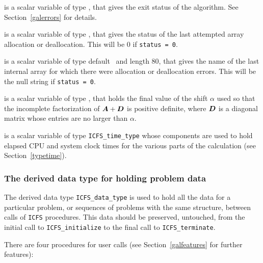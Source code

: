 \documentclass{galahad}
\newcommand{\packagename}{ICFS}
\begin{document}
\begin{description}
 is a scalar variable of type \integer, that gives the
exit status of the algorithm.
See Section~\ref{galerrors} for details.

 is a scalar variable of type \integer, that gives
the status of the last attempted array allocation or deallocation.
This will be 0 if {\tt status = 0}.

 is a scalar variable of type default \character\
and length 80, that  gives the name of the last internal array
for which there were allocation or deallocation errors.
This will be the null string if {\tt status = 0}.

 is a scalar variable of type \realdp, that holds
the final value of the shift $\alpha$ used so that the incomplete
factorization of ${\bm{A}} + {\bm{D}}$ is positive definite, where ${\bm{D}}$ is
a diagonal matrix whose entries are no larger than $\alpha$.

 is a scalar variable of type {\tt \packagename\_time\_type}
whose components are used to hold elapsed CPU and system clock times for the
various parts of the calculation (see Section~\ref{typetime}).

\end{description}


\subsubsection{The derived data type for holding problem data}\label{typedata}
The derived data type
{\tt \packagename\_data\_type}
is used to hold all the data for a particular problem,
or sequences of problems with the same structure, between calls of
{\tt \packagename} procedures.
This data should be preserved, untouched,
from the initial call to
{\tt \packagename\_initialize}
to the final call to
{\tt \packagename\_terminate}.


\galarguments
There are four procedures for user calls
(see Section~\ref{galfeatures} for further features):
\end{document}
